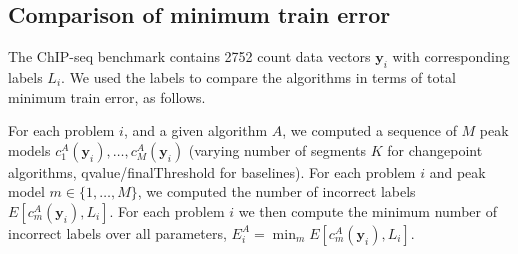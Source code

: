 \documentclass[twoside,11pt]{article}
\begin{document}




\subsection{Comparison of minimum train error}

The ChIP-seq benchmark contains 2752 count data vectors $\mathbf y_i$ with
corresponding labels $L_i$. We used the labels to compare the
algorithms in terms of total minimum train error, as follows.

For each problem $i$, and a given algorithm $A$, we computed a
sequence of $M$ peak models
$c^A_1(\mathbf y_i),\dots,c^A_M(\mathbf y_i)$ (varying number of
segments $K$ for changepoint algorithms, qvalue/finalThreshold for
baselines). For each problem $i$ and peak model
$m\in\{1,\dots,M\}$, we computed the number of incorrect labels
$E[c^A_m(\mathbf y_i), L_i]$. For each problem $i$ we then compute
the minimum number of incorrect labels over all parameters,
$E^A_i=\min_m E[c^A_m(\mathbf y_i), L_i]$.  
\end{document}
